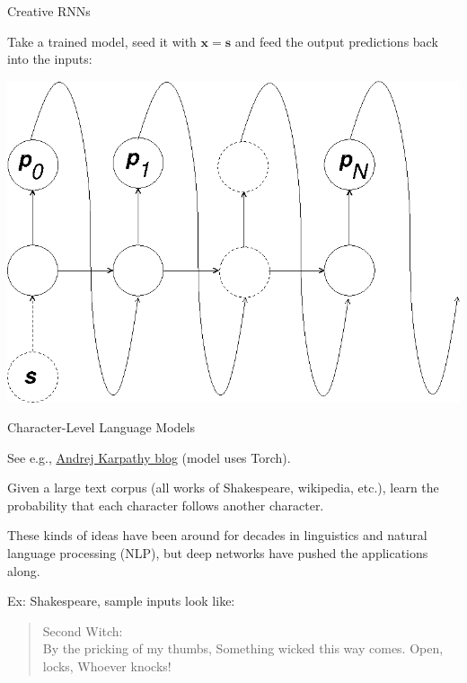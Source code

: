 \documentclass[12pt,t]{beamer}
\begin{document}
\begin{frame}{Creative RNNs}

Take a trained model, seed it with $\mathbf{x} = \mathbf{s}$ and feed the output predictions back into the inputs:

  \centerline{
\includegraphics[height=0.7\textheight]{./images/rnn-create.png} 
}

\end{frame}

\begin{frame}{Character-Level Language Models}

See e.g., \href{http://karpathy.github.io/2015/05/21/rnn-effectiveness/}{\color{blue}Andrej Karpathy blog} (model uses Torch).

\bigskip

Given a large text corpus (all works of Shakespeare, wikipedia, etc.), learn the probability that each character follows another character.

\bigskip

These kinds of ideas have been around for decades in linguistics and natural language processing (NLP), but deep networks have pushed the applications along.

\bigskip

Ex: Shakespeare, sample inputs look like:

\begin{quotation}
\noindent
Second Witch: \\
\noindent
By the pricking of my thumbs, 
Something wicked this way comes. 
Open, locks,
Whoever knocks!
\end{quotation}

\end{frame}
\end{document}

